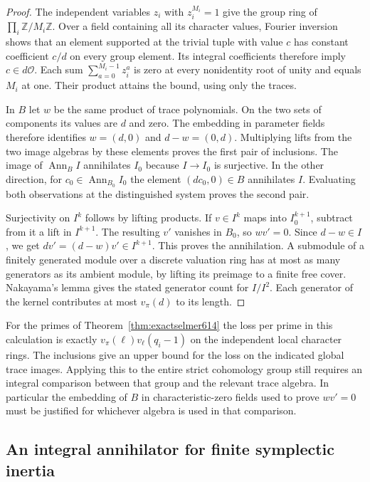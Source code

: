 \documentclass[a4paper,11pt]{article}
\theoremstyle{definition}
\theoremstyle{remark}
\newcommand{\ZZ}{\mathbb Z}\newcommand{\ord}{\operatorname{ord}}
\numberwithin{equation}{section}
\begin{document}
\begin{proof}
The independent variables \(z_i\) with \(z_i^{M_i}=1\) give
the group ring of \(\prod_i\ZZ/M_i\ZZ\). Over a field
containing all its character values, Fourier inversion shows
that an element supported at the trivial tuple with value
\(c\) has constant coefficient \(c/d\) on every group element.
Its integral coefficients therefore imply \(c\in d\mathcal O\).
Each sum \(\sum_{a=0}^{M_i-1}z_i^a\) is zero at every
nonidentity root of unity and equals \(M_i\) at one. Their
product attains the bound, using only the traces.

In \(B\) let \(w\) be the same product of trace polynomials.
On the two sets of components its values are \(d\) and zero.
The embedding in parameter fields therefore identifies
\(w=(d,0)\) and \(d-w=(0,d)\). Multiplying lifts from the
two image algebras by these elements proves the first pair
of inclusions. The image of \(\operatorname{Ann}_B I\)
annihilates \(I_0\) because \(I\to I_0\) is surjective.
In the other direction, for
\(c_0\in\operatorname{Ann}_{B_0}I_0\) the element
\((dc_0,0)\in B\) annihilates \(I\). Evaluating both
observations at the distinguished system proves the second pair.

Surjectivity on \(I^k\) follows by lifting products.
If \(v\in I^k\) maps into \(I_0^{k+1}\), subtract from it a
lift in \(I^{k+1}\). The resulting \(v'\) vanishes in \(B_0\),
so \(wv'=0\). Since \(d-w\in I\), we get
\(dv'=(d-w)v'\in I^{k+1}\). This proves the annihilation.
A submodule of a finitely generated module over a discrete
valuation ring has at most as many generators as its ambient
module, by lifting its preimage to a finite free cover.
Nakayama's lemma gives the stated generator count for
\(I/I^2\). Each generator of the kernel contributes at most
\(v_\pi(d)\) to its length.
\end{proof}

For the primes of Theorem~\ref{thm:exactselmer614} the loss
per prime in this calculation is exactly
\(v_\pi(\ell)v_\ell(q_i-1)\) on the independent local character
rings. The inclusions give an upper bound for the loss on the
indicated global trace images. Applying this to the entire
strict cohomology group still requires an integral comparison
between that group and the relevant trace algebra. In
particular the embedding of \(B\) in characteristic-zero
fields used to prove \(wv'=0\) must be justified for whichever
algebra is used in that comparison.


\subsection{An integral annihilator for finite symplectic inertia}
\label{sec:inertiaann654}
\end{document}
